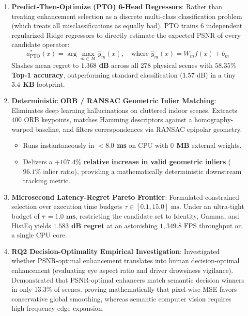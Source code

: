 \documentclass[10pt,a4paper]{article}
\begin{document}
\begin{enumerate}[leftmargin=*]
    \item \textbf{Predict-Then-Optimize (PTO) 6-Head Regressors}:
    Rather than treating enhancement selection as a discrete multi-class classification problem (which treats all misclassifications as equally bad), PTO trains 6 independent regularized Ridge regressors to directly estimate the expected PSNR of every candidate operator:
    \begin{equation}
    a_{\text{PTO}}^*(x) = \arg\max_{m \in \mathcal{M}} \hat{y}_m(x), \quad \text{where } \hat{y}_m(x) = W_m f(x) + b_m
    \end{equation}
    Slashes mean regret to \textbf{$1.368$ dB} across all 278 physical scenes with \textbf{$58.35\%$ Top-1 accuracy}, outperforming standard classification ($1.57$ dB) in a tiny \textbf{$3.4$ KB} footprint.

    \item \textbf{Deterministic ORB / RANSAC Geometric Inlier Matching}:
    Eliminates deep learning hallucinations on cluttered indoor scenes. Extracts 400 ORB keypoints, matches Hamming descriptors against a homography-warped baseline, and filters correspondences via RANSAC epipolar geometry.
    \begin{itemize}
        \item Runs instantaneously in \textbf{$<8.0$ ms} on CPU with \textbf{$0$ MB} external weights.
        \item Delivers a \textbf{$+107.4\%$ relative increase in valid geometric inliers} ($96.1\%$ inlier ratio), providing a mathematically deterministic downstream tracking metric.
    \end{itemize}

    \item \textbf{Microsecond Latency-Regret Pareto Frontier}:
    Formulated constrained selection over execution time budgets $\tau \in [0.1, 15.0]\text{ ms}$. Under an ultra-tight budget of $\mathbf{\tau = 1.0\text{ ms}}$, restricting the candidate set to Identity, Gamma, and HistEq yields \textbf{$1.583$ dB regret} at an astonishing \textbf{$1,349.8\text{ FPS}$} throughput on a single CPU core.

    \item \textbf{RQ2 Decision-Optimality Empirical Investigation}:
    Investigated whether PSNR-optimal enhancement translates into human decision-optimal enhancement (evaluating eye aspect ratio and driver drowsiness vigilance). Demonstrated that PSNR-optimal enhancers match semantic decision winners in only \textbf{$13.3\%$} of scenes, proving mathematically that pixel-wise MSE favors conservative global smoothing, whereas semantic computer vision requires high-frequency edge expansion.
\end{enumerate}
\end{document}
